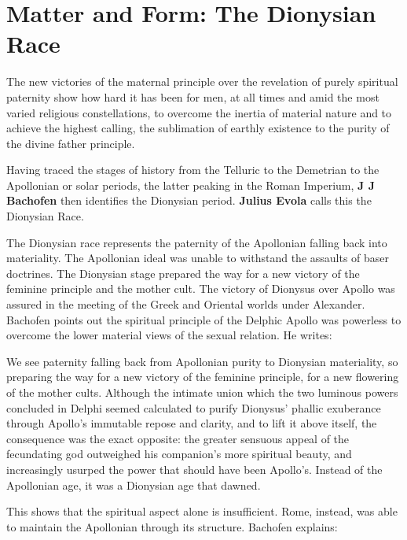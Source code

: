 \section{Matter and Form: The Dionysian Race}

\begin{quotex}
The new victories of the maternal principle over the revelation of purely spiritual paternity show how hard it has been for men, at all times and amid the most varied religious constellations, to overcome the inertia of material nature and to achieve the highest calling, the sublimation of earthly existence to the purity of the divine father principle. 

\end{quotex}
Having traced the stages of history from the Telluric to the Demetrian to the Apollonian or solar periods, the latter peaking in the Roman Imperium, \textbf{J J Bachofen} then identifies the Dionysian period. \textbf{Julius Evola} calls this the Dionysian Race.

The Dionysian race represents the paternity of the Apollonian falling back into materiality. The Apollonian ideal was unable to withstand the assaults of baser doctrines. The Dionysian stage prepared the way for a new victory of the feminine principle and the mother cult. The victory of Dionysus over Apollo was assured in the meeting of the Greek and Oriental worlds under Alexander. Bachofen points out the spiritual principle of the Delphic Apollo was powerless to overcome the lower material views of the sexual relation. He writes:

\begin{quotex}
We see paternity falling back from Apollonian purity to Dionysian materiality, so preparing the way for a new victory of the feminine principle, for a new flowering of the mother cults. Although the intimate union which the two luminous powers concluded in Delphi seemed calculated to purify Dionysus' phallic exuberance through Apollo's immutable repose and clarity, and to lift it above itself, the consequence was the exact opposite: the greater sensuous appeal of the fecundating god outweighed his companion's more spiritual beauty, and increasingly usurped the power that should have been Apollo's. Instead of the Apollonian age, it was a Dionysian age that dawned. 

\end{quotex}
This shows that the spiritual aspect alone is insufficient. Rome, instead, was able to maintain the Apollonian through its structure. Bachofen explains:

